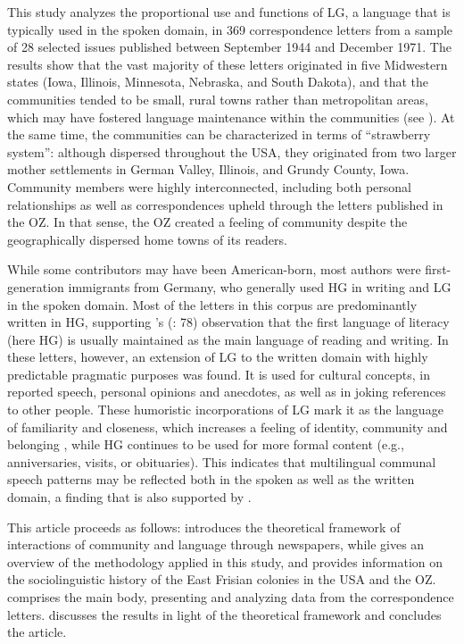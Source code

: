 \documentclass[output=paper]{langsci/langscibook}
\begin{document}
This study analyzes the proportional use and functions of LG, a language that is typically used in the spoken domain, in 369 correspondence letters from a sample of 28 selected issues published between September 1944 and December 1971. The results show that the vast majority of these letters originated in five Midwestern states (Iowa, Illinois, Minnesota, Nebraska, and South Dakota), and that the communities tended to be small, rural towns rather than metropolitan areas, which may have fostered language maintenance within the communities (see \citealt{Louden2006}). At the same time, the communities can be characterized in terms of  “strawberry system”: although dispersed throughout the USA, they originated from two larger mother settlements in German Valley, Illinois, and Grundy County, Iowa. Community members were highly interconnected, including both personal relationships as well as correspondences upheld through the letters published in the OZ. In that sense, the OZ created a feeling of community despite the geographically dispersed home towns of its readers.

While some contributors may have been American-born, most authors were first-generation immigrants from Germany, who generally used HG in writing and LG in the spoken domain. Most of the letters in this corpus are predominantly written in HG, supporting \citeauthor{Fishman1965}'s (\citeyear{Fishman1965}: 78) observation that the first language of literacy (here HG) is usually maintained as the main language of reading and writing. In these letters, however, an extension of LG to the written domain with highly predictable pragmatic purposes was found. It is used for cultural concepts, in reported speech, personal opinions and anecdotes, as well as in joking references to other people. These humoristic incorporations of LG mark it as the language of familiarity and closeness, which increases a feeling of identity, community and belonging \citep{Pavlenko2002}, while HG continues to be used for more formal content (e.g., anniversaries, visits, or obituaries). This indicates that multilingual communal speech patterns may be reflected both in the spoken as well as the written domain, a finding that is also supported by .

This article proceeds as follows:  introduces the theoretical framework of interactions of community and language through newspapers, while  gives an overview of the methodology applied in this study, and provides information on the sociolinguistic history of the East Frisian colonies in the USA and the OZ.  comprises the main body, presenting and analyzing data from the correspondence letters.  discusses the results in light of the theoretical framework and concludes the article.
\end{document}

